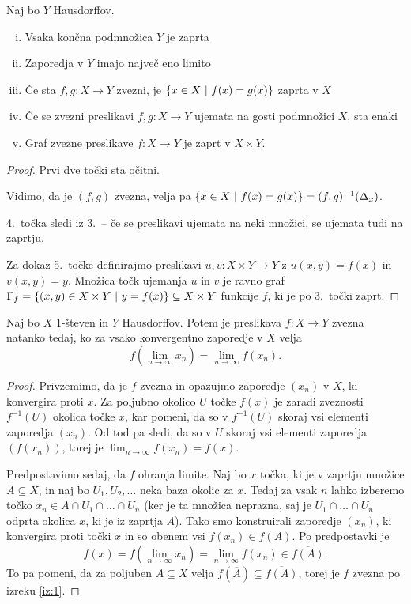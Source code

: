 \begin{izrek}
Naj bo $Y$ Hausdorffov.

\begin{enumerate}[i)]
\item Vsaka končna podmnožica $Y$ je zaprta
\item Zaporedja v $Y$ imajo največ eno limito
\item Če sta $f, g \colon X \to Y$ zvezni, je
$\left\{x \in X~\middle\vert~f(x) = g(x)\right\}$ zaprta v $X$
\item Če se zvezni preslikavi $f, g \colon X \to Y$ ujemata na
gosti podmnožici $X$, sta enaki
\item Graf zvezne preslikave $f \colon X \to Y$ je zaprt v
$X \times Y$.
\end{enumerate}
\end{izrek}

\begin{proof}
Prvi dve točki sta očitni.

Vidimo, da je $(f,g)$ zvezna, velja pa
$\left\{x \in X~\middle\vert~f(x) = g(x)\right\} = (f,g)^{-1}(\Delta_x)$.

4.\ točka sledi iz 3.\ -- če se preslikavi ujemata na neki množici,
se ujemata tudi na zaprtju.

Za dokaz 5.\ točke definirajmo preslikavi
$u, v \colon X \times Y \to Y$ z $u(x,y) = f(x)$ in $v(x,y) = y$.
Množica točk ujemanja $u$ in $v$ je ravno graf
$\Gamma_f = \left\{(x,y) \in X \times Y~\middle\vert~y = f(x)\right\} \subseteq
X \times Y$ funkcije $f$, ki je po 3.\ točki zaprt.
\end{proof}

\begin{izrek}
Naj bo $X$ 1-števen in $Y$ Hausdorffov. Potem je preslikava
$f \colon X \to Y$ zvezna natanko tedaj, ko za vsako konvergentno
zaporedje v $X$ velja
\[
f\left(\lim_{n\to\infty} x_n\right) = \lim_{n\to\infty} f(x_n).
\]
\end{izrek}

\begin{proof}
Privzemimo, da je $f$ zvezna in opazujmo zaporedje $(x_n)$ v $X$,
ki konvergira proti $x$. Za poljubno okolico $U$ točke $f(x)$ je
zaradi zveznosti $f^{-1}(U)$ okolica točke $x$, kar pomeni, da so v
$f^{-1}(U)$ skoraj vsi elementi zaporedja $(x_n)$. Od tod pa sledi,
da so v $U$ skoraj vsi elementi zaporedja $(f(x_n))$, torej je
$\lim_{n \to \infty} f(x_n) = f(x)$.

Predpostavimo sedaj, da $f$ ohranja limite. Naj bo $x$ točka, ki je
v zaprtju množice $A \subseteq X$, in naj bo $U_1, U_2, \dots$ neka
baza okolic za $x$. Tedaj za vsak $n$ lahko izberemo točko
$x_n \in A \cap U_1 \cap \dots \cap U_n$ (ker je ta množica
neprazna, saj je $U_1 \cap \dots \cap U_n$ odprta okolica $x$, ki
je iz zaprtja $A$). Tako smo konstruirali zaporedje $(x_n)$, ki
konvergira proti točki $x$ in so obenem vsi $f(x_n) \in f(A)$. Po
predpostavki je
\[
f(x) =
f\left(\lim_{n \to \infty} x_n\right) =
\lim_{n \to \infty} f(x_n)
\in \overline{f(A)}.
\]
To pa pomeni, da za poljuben $A \subseteq X$ velja
$f(\overline{A}) \subseteq \overline{f(A)}$, torej je $f$ zvezna po
izreku \ref{iz:1}.
\end{proof}

